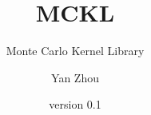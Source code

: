 \documentclass[bib]{mbook}
\begin{document}
\frontmatter
\title{MCKL}
\subtitle{Monte Carlo Kernel Library}
\author{Yan Zhou}
\date{version 0.1}
\maketitle
\tableofcontents
\listoftables

\mainmatter







\printbibliography

\appendix


\end{document}
